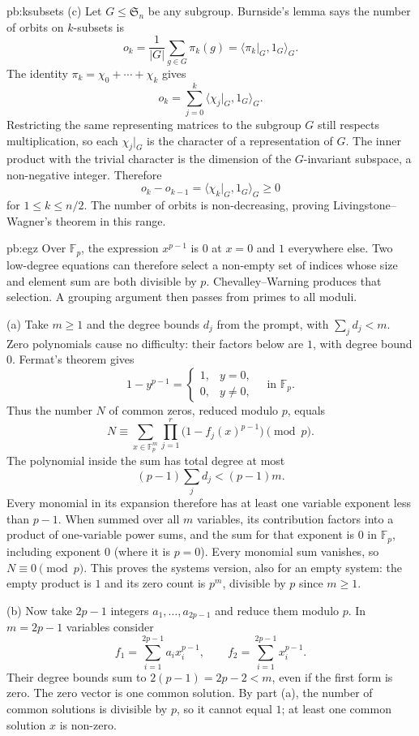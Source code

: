 \begin{solution}{pb:ksubsets}
(c) Let $G\le\mathfrak S_n$ be any subgroup. Burnside's lemma says the number of orbits on $k$-subsets is
\[
o_k=\frac1{|G|}\sum_{g\in G}\pi_k(g)
=\langle\pi_k|_G,1_G\rangle_G.
\]
The identity $\pi_k=\chi_0+\cdots+\chi_k$ gives
\[
o_k=\sum_{j=0}^k\langle\chi_j|_G,1_G\rangle_G.
\]
Restricting the same representing matrices to the subgroup $G$ still respects multiplication, so each $\chi_j|_G$ is the character of a representation of $G$. The inner product with the trivial character is the dimension of the $G$-invariant subspace, a non-negative integer. Therefore
\[
o_k-o_{k-1}=\langle\chi_k|_G,1_G\rangle_G\ge0
\]
for $1\le k\le n/2$. The number of orbits is non-decreasing, proving Livingstone--Wagner's theorem in this range.
\end{solution}

\begin{solution}{pb:egz}
\idea Over $\mathbb F_p$, the expression $x^{p-1}$ is $0$ at $x=0$ and $1$ everywhere else. Two low-degree equations can therefore select a non-empty set of indices whose size and element sum are both divisible by $p$. Chevalley--Warning produces that selection. A grouping argument then passes from primes to all moduli.

\writeup (a) Take $m\ge1$ and the degree bounds $d_j$ from the prompt, with $\sum_jd_j<m$. Zero polynomials cause no difficulty: their factors below are $1$, with degree bound $0$. Fermat's theorem gives
\[
1-y^{p-1}=\begin{cases}1,&y=0,\\0,&y\ne0,\end{cases}
\quad\text{in }\mathbb F_p.
\]
Thus the number $N$ of common zeros, reduced modulo $p$, equals
\[
N\equiv\sum_{x\in\mathbb F_p^m}
\prod_{j=1}^r\bigl(1-f_j(x)^{p-1}\bigr)\pmod p.
\]
The polynomial inside the sum has total degree at most
\[
(p-1)\sum_jd_j<(p-1)m.
\]
Every monomial in its expansion therefore has at least one variable exponent less than $p-1$. When summed over all $m$ variables, its contribution factors into a product of one-variable power sums, and the sum for that exponent is $0$ in $\mathbb F_p$, including exponent $0$ (where it is $p=0$). Every monomial sum vanishes, so $N\equiv0\pmod p$. This proves the systems version, also for an empty system: the empty product is $1$ and its zero count is $p^m$, divisible by $p$ since $m\ge1$.

(b) Now take $2p-1$ integers $a_1,\ldots,a_{2p-1}$ and reduce them modulo $p$. In $m=2p-1$ variables consider
\[
f_1=\sum_{i=1}^{2p-1}a_ix_i^{p-1},
\qquad
f_2=\sum_{i=1}^{2p-1}x_i^{p-1}.
\]
Their degree bounds sum to $2(p-1)=2p-2<m$, even if the first form is zero. The zero vector is one common solution. By part (a), the number of common solutions is divisible by $p$, so it cannot equal $1$; at least one common solution $x$ is non-zero.


\end{solution}
